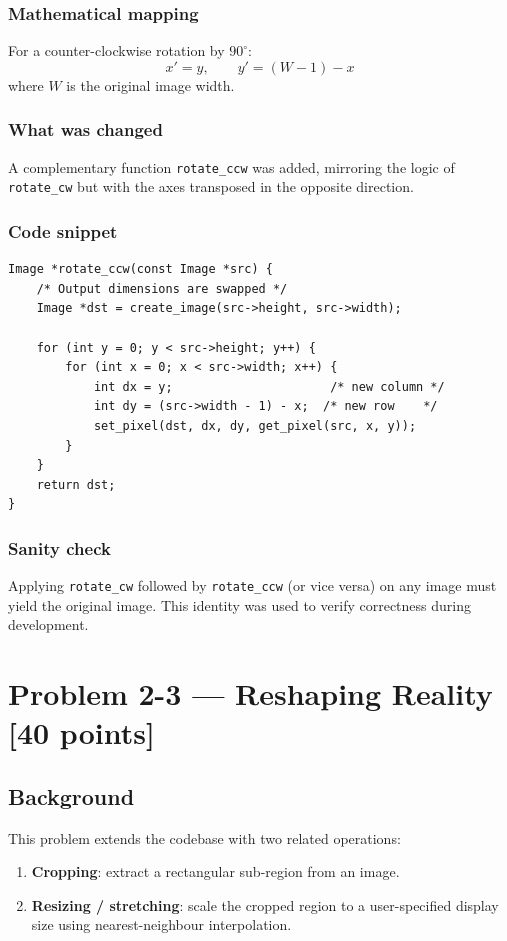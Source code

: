 \documentclass[12pt,a4paper]{article}
\begin{document}
\subsubsection*{Mathematical mapping}
For a counter-clockwise rotation by $90^\circ$:
\[
    x' = y, \qquad y' = (W - 1) - x
\]
where \(W\) is the original image width.

\subsubsection*{What was changed}
A complementary function \texttt{rotate\_ccw} was added, mirroring the logic
of \texttt{rotate\_cw} but with the axes transposed in the opposite direction.

\subsubsection*{Code snippet}

\begin{lstlisting}
Image *rotate_ccw(const Image *src) {
    /* Output dimensions are swapped */
    Image *dst = create_image(src->height, src->width);

    for (int y = 0; y < src->height; y++) {
        for (int x = 0; x < src->width; x++) {
            int dx = y;                      /* new column */
            int dy = (src->width - 1) - x;  /* new row    */
            set_pixel(dst, dx, dy, get_pixel(src, x, y));
        }
    }
    return dst;
}
\end{lstlisting}

\subsubsection*{Sanity check}
Applying \texttt{rotate\_cw} followed by \texttt{rotate\_ccw} (or vice versa)
on any image must yield the original image.
This identity was used to verify correctness during development.

\newpage

\section{Problem 2-3 — Reshaping Reality \textnormal{[40 points]}}

\subsection*{Background}
This problem extends the codebase with two related operations:
\begin{enumerate}
    \item \textbf{Cropping}: extract a rectangular sub-region from an image.
    \item \textbf{Resizing / stretching}: scale the cropped region to a
          user-specified display size using nearest-neighbour interpolation.
\end{enumerate}
\end{document}
